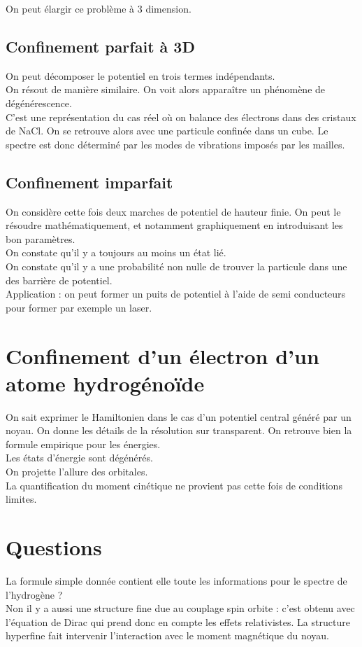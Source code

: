 \documentclass[12pt,prb,aps,epsf]{article}
\begin{document}
On peut élargir ce problème à 3 dimension.

\subsection{Confinement parfait à 3D}
On peut décomposer le potentiel en trois termes indépendants.\\
On résout de manière similaire. On voit alors apparaître un phénomène de dégénérescence.\\
C'est une représentation du cas réel où on balance des électrons dans des cristaux de NaCl. On se retrouve alors avec une particule confinée dans un cube. Le spectre est donc déterminé par les modes de vibrations imposés par les mailles.
	
\subsection{Confinement imparfait}
On considère cette fois deux marches de potentiel de hauteur finie. On peut le résoudre mathématiquement, et notamment graphiquement en introduisant les bon paramètres. \\
On constate qu'il y a toujours au moins un état lié. \\
On constate qu'il y a une probabilité non nulle de trouver la particule dans une des barrière de potentiel.\\

Application : on peut former un puits de potentiel à l'aide de semi conducteurs pour former par exemple un laser.

\section{Confinement d'un électron d'un atome hydrogénoïde}
On sait exprimer le Hamiltonien dans le cas d'un potentiel central généré par un noyau. On donne les détails de la résolution sur transparent. On retrouve bien la formule empirique pour les énergies.\\
Les états d'énergie sont dégénérés.\\
On projette l'allure des orbitales.\\
La quantification du moment cinétique ne provient pas cette fois de conditions limites.

\section*{Questions}
La formule simple donnée contient elle toute les informations pour le spectre de l'hydrogène ?\\
Non il y a aussi une structure fine due au couplage spin orbite : c'est obtenu avec l'équation de Dirac qui prend donc en compte les effets relativistes. La structure hyperfine fait intervenir l'interaction avec le moment magnétique du noyau.\\
\end{document}

